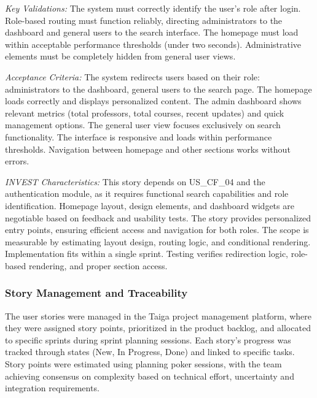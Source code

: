 \documentclass[12pt,a4paper]{article}
\begin{document}
\textit{Key Validations:} The system must correctly identify the user's role after login. Role-based routing must function reliably, directing administrators to the dashboard and general users to the search interface. The homepage must load within acceptable performance thresholds (under two seconds). Administrative elements must be completely hidden from general user views.\newline

\textit{Acceptance Criteria:} The system redirects users based on their role: administrators to the dashboard, general users to the search page. The homepage loads correctly and displays personalized content. The admin dashboard shows relevant metrics (total professors, total courses, recent updates) and quick management options. The general user view focuses exclusively on search functionality. The interface is responsive and loads within performance thresholds. Navigation between homepage and other sections works without errors.\newline

\textit{INVEST Characteristics:} This story depends on US\_CF\_04 and the authentication module, as it requires functional search capabilities and role identification. Homepage layout, design elements, and dashboard widgets are negotiable based on feedback and usability tests. The story provides personalized entry points, ensuring efficient access and navigation for both roles. The scope is measurable by estimating layout design, routing logic, and conditional rendering. Implementation fits within a single sprint. Testing verifies redirection logic, role-based rendering, and proper section access.\newline

\subsubsection{Story Management and Traceability}

The user stories were managed in the Taiga project management platform, where they were assigned story points, prioritized in the product backlog, and allocated to specific sprints during sprint planning sessions. Each story's progress was tracked through states (New, In Progress, Done) and linked to specific tasks. Story points were estimated using planning poker sessions, with the team achieving consensus on complexity based on technical effort, uncertainty and integration requirements.\newline
\end{document}

